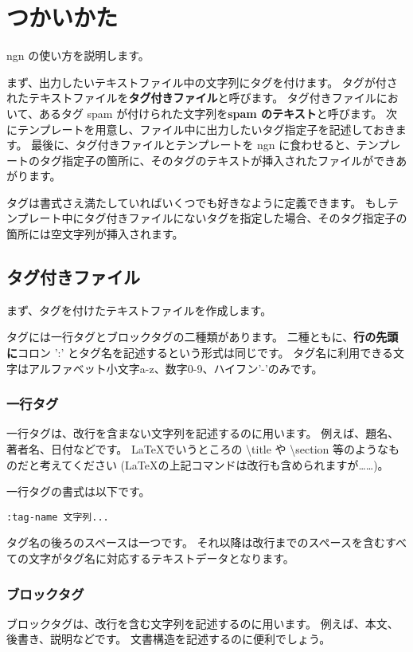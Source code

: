 \documentclass[a4j]{jsarticle}
\begin{document}
\section{つかいかた}
ngn の使い方を説明します。

まず、出力したいテキストファイル中の文字列にタグを付けます。
タグが付されたテキストファイルを\textbf{タグ付きファイル}と呼びます。
タグ付きファイルにおいて、あるタグ spam が付けられた文字列を\textbf{spam のテキスト}と呼びます。
次にテンプレートを用意し、ファイル中に出力したいタグ指定子を記述しておきます。
最後に、タグ付きファイルとテンプレートを ngn に食わせると、テンプレートのタグ指定子の箇所に、そのタグのテキストが挿入されたファイルができあがります。

タグは書式さえ満たしていればいくつでも好きなように定義できます。
もしテンプレート中にタグ付きファイルにないタグを指定した場合、そのタグ指定子の箇所には空文字列が挿入されます。


\subsection{タグ付きファイル}
まず、タグを付けたテキストファイルを作成します。


タグには一行タグとブロックタグの二種類があります。
二種ともに、\textbf{行の先頭に}コロン ':' とタグ名を記述するという形式は同じです。
タグ名に利用できる文字はアルファベット小文字a-z、数字0-9、ハイフン'-'のみです。


\subsubsection{一行タグ}
一行タグは、改行を含まない文字列を記述するのに用います。
例えば、題名、著者名、日付などです。
\LaTeX でいうところの \textbackslash title や \textbackslash section 等のようなものだと考えてください (\LaTeX の上記コマンドは改行も含められますが……)。

一行タグの書式は以下です。
\begin{lstlisting}[caption=一行タグの書式]
:tag-name 文字列...
\end{lstlisting}
タグ名の後ろのスペースは一つです。
それ以降は改行までのスペースを含むすべての文字がタグ名に対応するテキストデータとなります。


\subsubsection{ブロックタグ}
ブロックタグは、改行を含む文字列を記述するのに用います。
例えば、本文、後書き、説明などです。
文書構造を記述するのに便利でしょう。
\end{document}
